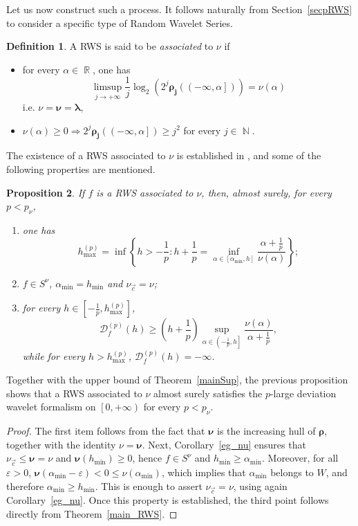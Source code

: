 \documentclass[a4paper,11pt,oneside]{article}
\DeclareMathOperator{\R}{\mathbb{R}}
\DeclareMathOperator{\N}{\mathbb{N}}
\newcommand{\coint}[1]{\left[{#1}\right)}
\newcommand{\ccint}[1]{\left[{#1}\right]}
\newcommand{\ocint}[1]{\left({#1}\right]}
\theoremstyle{definition}
\newtheorem{defi}{Definition}[section]
\theoremstyle{plain}
\newtheorem{prop}[defi]{Proposition}
\begin{document}
Let us now construct such a process. It follows naturally from Section~\ref{secpRWS} to consider a specific type of Random Wavelet Series.

\begin{defi}
A RWS is said to be \textit{associated} to $\nu$ if 
\begin{itemize}
\item for every $\alpha\in\R$, one has
\[
\limsup_{j\rightarrow+\infty}\frac{1}{j}\log_2\left(2^j\bm{\rho_j}(\ocint{-\infty,\alpha})\right)=\nu(\alpha)
\]
i.e. $\nu=\bm{\nu}=\bm{\lambda}$,
\item $\nu(\alpha)\geq 0\Rightarrow2^j\bm{\rho_j}(\ocint{-\infty,\alpha})\geq j^2$ for every $j\in\N$.
\end{itemize}
\end{defi}

The existence of a RWS associated to $\nu$ is established in \cite{aubryPrevalence}, and some of the following properties are mentioned.

\begin{prop}\label{RWSnu}
If $f$ is a RWS associated to $\nu$, then, almost surely, for every $p<p_\nu$,
\begin{enumerate}
\item one has
\[
h_{\max}^{(p)}
=
\inf\left\{
h>-\frac{1}{p}:
h+\frac{1}{p}
=
\inf_{\alpha\in\ccint{\alpha_{\min},h}}
\frac{\alpha+\frac{1}{p}}{\nu(\alpha)}
\right\};
\]

\item $f\in S^\nu$,
$\alpha_{\min}=h_{\min}$
and
$\nu_{\vec{c}}=\nu$;
\item for every
$h\in\ccint{-\frac1p,h_{\max}^{(p)}}$,
\[
\mathscr{D}_f^{(p)}(h)
\geq
\left(h+\frac{1}{p}\right)
\sup_{\alpha\in\ocint{-\frac{1}{p},h}}
\frac{\nu(\alpha)}{\alpha+\frac{1}{p}},
\]
while for every $h>h_{\max}^{(p)}$, $\mathscr{D}_f^{(p)}(h)=-\infty$. 
\end{enumerate}
\end{prop}


Together with the upper bound of Theorem~\ref{mainSup}, the previous
proposition shows that a RWS associated to $\nu$ almost surely satisfies
the $p$-large deviation wavelet formalism on $\coint{0,+\infty}$ for
every $p<p_\nu$.


\begin{proof}
The first item follows from the fact that $\bm{\nu}$ is the increasing hull of $\bm{\rho}$, together with the identity $\nu=\bm{\nu}$.
 Next, Corollary~\ref{eg_nu} ensures that $\nu_{\vec{c}}\leq\bm{\nu}=\nu$ and $\bm{\nu}(h_{\min})\geq0$, hence $f\in S^\nu$ and $h_{\min}\geq\alpha_{\min}$. Moreover, for all $\varepsilon>0$, $\bm{\nu}(\alpha_{\min}-\varepsilon)<0\leq \nu(\alpha_{\min})$, which implies that $\alpha_{\min}$ belongs to $W$, and therefore $\alpha_{\min}\geq h_{\min}$. This is enough to assert 
$\nu_{\vec{c}}=\nu$, using again Corollary~\ref{eg_nu}. Once this property is established, the third point follows directly from Theorem~\ref{main_RWS}.
\end{proof}
\end{document}
